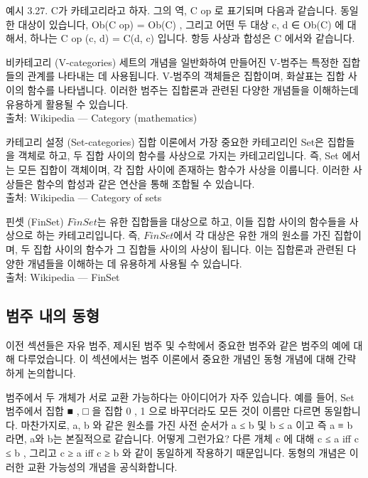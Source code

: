 \documentclass[11pt, a4paper, twoside, openany]{book}
\begin{document}
{\par\medskip
예시 3.27. C\hspace{0pt}가 카테고리라고 하자.
그의 역, C op 로 표기되며 다음과 같습니다.
동일한 대상이 있습니다, Ob(C op) = Ob(C) , 그리고 어떤 두 대상 c, d ∈ Ob(C) 에 대해서, 하나는 C op (c, d) = C(d, c) 입니다. 항등 사상과 합성은 C 에서와 같습니다.

\begin{deepresearch}{비카테고리 (V-categories)}
세트의 개념을 일반화하여 만들어진 V-범주는 특정한 집합들의 관계를 나타내는 데 사용됩니다.  V-범주의 객체들은 집합이며, 화살표는 집합 사이의 함수를 나타냅니다. 이러한 범주는 집합론과 관련된 다양한 개념들을 이해하는데 유용하게 활용될 수 있습니다.
\\[4pt]{\footnotesize\color{ctgray} 출처: Wikipedia — Category (mathematics)}
\end{deepresearch}

\begin{deepresearch}{카테고리 설정 (Set-categories)}
집합 이론에서 가장 중요한 카테고리인 Set\hspace{0pt}은 집합들을 객체로 하고, 두 집합 사이의 함수를 사상으로 가지는 카테고리입니다.  즉, Set 에서는 모든 집합이 객체이며, 각 집합 사이에 존재하는 함수가 사상을 이룹니다. 이러한 사상들은 함수의 합성과 같은 연산을 통해 조합될 수 있습니다.
\\[4pt]{\footnotesize\color{ctgray} 출처: Wikipedia — Category of sets}
\end{deepresearch}

\begin{deepresearch}{핀셋 (FinSet)}
$FinSet$는 유한 집합들을 대상으로 하고, 이들 집합 사이의 함수들을 사상으로 하는 카테고리입니다. 즉, $FinSet$에서 각 대상은 유한 개의 원소를 가진 집합이며, 두 집합 사이의 함수가 그 집합들 사이의 사상이 됩니다.  이는 집합론과 관련된 다양한 개념들을 이해하는 데 유용하게 사용될 수 있습니다.
\\[4pt]{\footnotesize\color{ctgray} 출처: Wikipedia — FinSet}
\end{deepresearch}


\subsection{범주 내의 동형}
\label{sec:3-2-5}

이전 섹션들은 자유 범주, 제시된 범주 및 수학에서 중요한 범주와 같은 범주의 예에 대해 다루었습니다. 이 섹션에서는 범주 이론에서 중요한 개념인 동형 개념에 대해 간략하게 논의합니다.

\par\medskip
범주에서 두 개체가 서로 교환 가능하다는 아이디어가 자주 있습니다. 예를 들어, Set 범주에서 집합 { ■ , □ }을 집합 { 0 , 1 }으로 바꾸더라도 모든 것이 이름만 다르면 동일합니다. 마찬가지로, a, b 와 같은 원소를 가진 사전 순서가 a ≤ b 및 b ≤ a 이고 즉 a ≡ b 라면, a\hspace{0pt}와 b\hspace{0pt}는 본질적으로 같습니다. 어떻게 그런가요? 다른 개체 c 에 대해 c ≤ a iﬀ c ≤ b , 그리고 c ≥ a iﬀ c ≥ b 와 같이 동일하게 작용하기 때문입니다. 동형의 개념은 이러한 교환 가능성의 개념을 공식화합니다.

}
\end{document}
